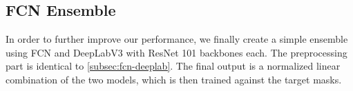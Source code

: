 \subsection{FCN Ensemble} \label{subsec:ensemble}
In order to further improve our performance, we finally create a simple ensemble using FCN and DeepLabV3 with ResNet 101 backbones each. The preprocessing part is identical to \autoref{subsec:fcn-deeplab}. The final output is a normalized linear combination of the two models, which is then trained against the target masks.
